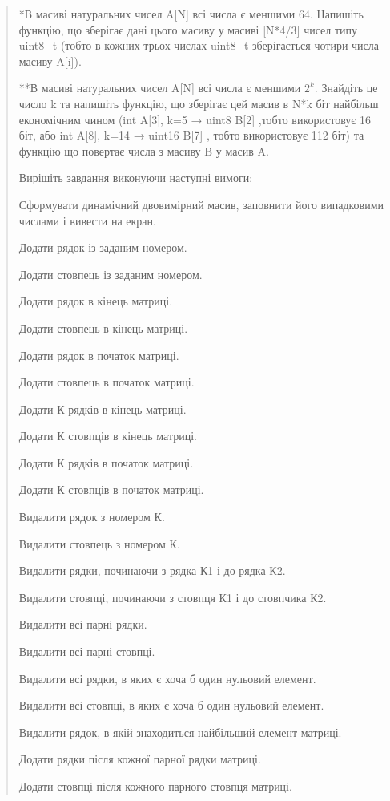 \documentclass[]{article}
\begin{document}
\begin{quote}
*В масиві натуральних чисел A{[}N{]} всі числа є меншими 64. Напишіть
функцію, що зберігає дані цього масиву у масиві {[}N*4/3{]} чисел типу
uint8\_t (тобто в кожних трьох числах uint8\_t зберігається чотири числа
масиву A{[}i{]}).

**В масиві натуральних чисел A{[}N{]} всі числа є меншими \(2^{k}\).
Знайдіть це число k та напишіть функцію, що зберігає цей масив в N*k біт
найбільш економічним чином (int A{[}3{]}, k=5 → uint8 B{[}2{]} ,тобто
використовує 16 біт, або int A{[}8{]}, k=14 → uint16 B{[}7{]} , тобто
використовує 112 біт) та функцію що повертає числа з масиву B у масив A.

Вирішіть завдання виконуючи наступні вимоги:

Сформувати динамічний двовимірний масив, заповнити його випадковими
числами і вивести на екран.

Додати рядок із заданим номером.

Додати стовпець із заданим номером.

Додати рядок в кінець матриці.

Додати стовпець в кінець матриці.

Додати рядок в початок матриці.

Додати стовпець в початок матриці.

Додати К рядків в кінець матриці.

Додати К стовпців в кінець матриці.

Додати К рядків в початок матриці.

Додати К стовпців в початок матриці.

Видалити рядок з номером К.

Видалити стовпець з номером К.

Видалити рядки, починаючи з рядка К1 і до рядка К2.

Видалити стовпці, починаючи з стовпця К1 і до стовпчика К2.

Видалити всі парні рядки.

Видалити всі парні стовпці.

Видалити всі рядки, в яких є хоча б один нульовий елемент.

Видалити всі стовпці, в яких є хоча б один нульовий елемент.

Видалити рядок, в якій знаходиться найбільший елемент матриці.

Додати рядки після кожної парної рядки матриці.

Додати стовпці після кожного парного стовпця матриці.


\end{quote}
\end{document}
